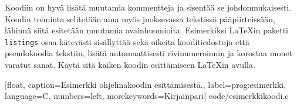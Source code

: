 Koodiin on hyvä lisätä muutamia kommentteja ja sisentää se johdonmukaisesti. Koodin toiminta selitetään aina myös juoksevassa tekstissä pääpiirteissään, lähinnä siitä esitetään muutamia avainhuomioita. Esimerkiksi \LaTeX{}in paketti \texttt{listings} \parencite{listings,notsoshort} osaa kätevästi sisällyttää sekä oikeita kooditiedostoja että pseudokoodia tekstiin, lisätä automaattisesti rivinumeroinnin ja korostaa monet varatut sanat. Käytä sitä kaiken koodin esittämiseen \LaTeX{}in avulla.

\renewcommand{\lstlistingname}{Ohjelma}

   [float,
   caption={Esimerkki ohjelmakoodin esittämisestä.},
   label=prog:esimerkki,
   language=C,
   numbers=left,
   morekeywords={Kirjainpari}]
   {code/esimerkkikoodi.c}

